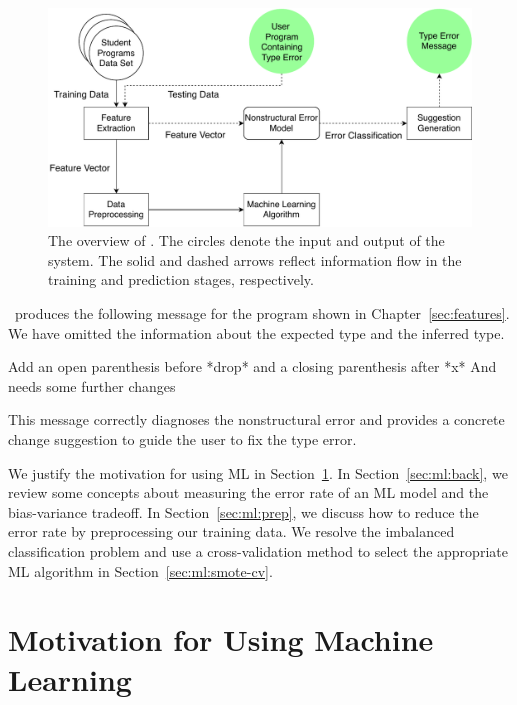 \documentclass[12pt]{report}	%
\begin{document}
\begin{figure}
\centering
\includegraphics[scale=.85]{images/Learnskell.pdf}
\caption[The overview of \newCompiler]{The overview of \newCompiler. The circles denote the input
and output of the system. 
The solid and dashed arrows
reflect information flow in the training and prediction
stages, respectively.
}
\label{fig:arch}
\end{figure}

\newCompiler\ produces the following message
for the  program shown in Chapter~\ref{sec:features}.
We have omitted
the information about the expected type and the inferred type.
%
\begin{program}
Add an open parenthesis before *drop* and a closing parenthesis after *x*
And needs some further changes
\end{program}
%
This message correctly diagnoses the nonstructural error and 
provides a concrete change suggestion to guide the user to fix
the type error. 


We justify the motivation for using ML in Section~\ref{sec:ml:motivation}.
In Section~\ref{sec:ml:back}, we review some concepts about
measuring the error rate of an ML model
and the bias-variance tradeoff.
In Section~\ref{sec:ml:prep}, we discuss
how to reduce the error rate by preprocessing our training data.
We resolve the
imbalanced classification problem
and use a cross-validation method to
select the appropriate ML algorithm in Section~\ref{sec:ml:smote-cv}.


\section{Motivation for Using Machine Learning}
\label{sec:ml:motivation}
\end{document}
